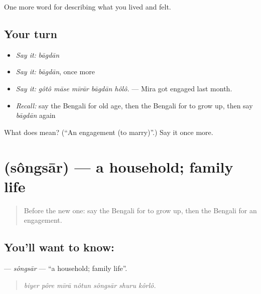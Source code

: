 \begin{grammarlens}[title={What you've built}]
One more word for describing what you lived and felt.
\end{grammarlens}

\subsection*{Your turn}
\begin{itemize}
\raggedright
  \item \emph{Say it:} \emph{bāgdān}
  \item \emph{Say it:} \emph{bāgdān}, once more
  \item \emph{Say it:} \emph{gôtô māse mīrār bāgdān hôlô.} — Mira got engaged last month.
  \item \emph{Recall:} say the Bengali for old age, then the Bengali for to grow up, then say \emph{bāgdān} again
\end{itemize}

\begin{tcolorbox}[breakable,colback=teal!4,colframe=teal!35!black,title={Before you move on}]
What does  mean? (\textquotedblleft{}An engagement (to marry)\textquotedblright{}.) Say it once more.
\end{tcolorbox}
\section[\texorpdfstring{\bn{সংসার} (sôngsār)}{সংসার (sôngsār)}]{ (sôngsār) — a household; family life}

\label{lesson:BN-C489-songsar}



\begin{quote}
Before the new one: say the Bengali for to grow up, then the Bengali for an engagement.
\end{quote}

\subsection*{You'll want to know: }
\textbf{} — \emph{sôngsār} — \textquotedblleft{}a household; family life\textquotedblright{}.

\begin{quote}
      
\end{quote}

\begin{quote}
\emph{biyer pôre mīrā nôtun sôngsār shuru kôrlô.}
\end{quote}

